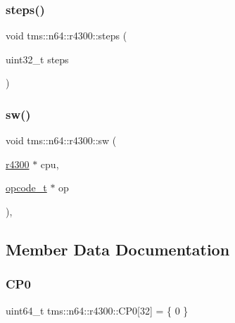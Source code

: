 \mbox{\label{classtms_1_1n64_1_1r4300_a206d793232017de674270ded7a7c0a12}} 
\subsubsection{\texorpdfstring{steps()}{steps()}}
{\footnotesize\ttfamily void tms\+::n64\+::r4300\+::steps (\begin{DoxyParamCaption}\item[{uint32\+\_\+t}]{steps }\end{DoxyParamCaption})}

\mbox{\label{classtms_1_1n64_1_1r4300_afe9ab97e8873f4ea7241a6e037e713c4}} 
\subsubsection{\texorpdfstring{sw()}{sw()}}
{\footnotesize\ttfamily void tms\+::n64\+::r4300\+::sw (\begin{DoxyParamCaption}\item[{\hyperlink{classtms_1_1n64_1_1r4300}{r4300} $\ast$}]{cpu,  }\item[{\hyperlink{classtms_1_1n64_1_1opcode__t}{opcode\+\_\+t} $\ast$}]{op }\end{DoxyParamCaption})\hspace{0.3cm}{\ttfamily [static]}, {\ttfamily [private]}}



\subsection{Member Data Documentation}
\mbox{\label{classtms_1_1n64_1_1r4300_a95c65bd068adb9212d1a22ac5825064e}} 
\subsubsection{\texorpdfstring{C\+P0}{CP0}}
{\footnotesize\ttfamily uint64\+\_\+t tms\+::n64\+::r4300\+::\+C\+P0\mbox{[}32\mbox{]} = \{ 0 \}\hspace{0.3cm}{\ttfamily [private]}}

